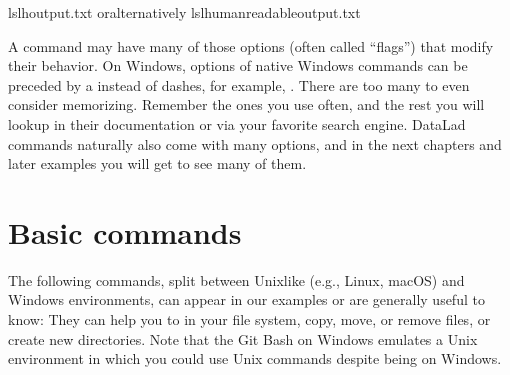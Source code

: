 \begin{sphinxVerbatim}[commandchars=\\\{\}]
ls\PYGZhy{}lhoutput.txt
oralternatively
ls\PYGZhy{}l\PYGZhy{}\PYGZhy{}human\PYGZhy{}readableoutput.txt
\end{sphinxVerbatim}

\sphinxAtStartPar
A command may have many of those options (often called “flags”) that modify their behavior.
On Windows, options of native Windows commands can be preceded by a \sphinxcode{\sphinxupquote{/}} instead of dashes, for example, .
There are too many to even consider memorizing. Remember the ones you use often,
and the rest you will lookup in their documentation or via your favorite search engine.
DataLad commands naturally also come with many options, and in the next chapters
and later examples you will get to see many of them.


\section{Basic commands}
\label{\detokenize{intro/howto:basic-commands}}
\sphinxAtStartPar
The following commands, split between Unix\sphinxhyphen{}like (e.g., Linux, macOS) and Windows environments, can appear in our examples or are generally useful to know:
They can help you to  in your file system, copy, move, or remove files, or create new directories.
Note that the Git Bash on Windows emulates a Unix environment in which you could use Unix commands despite being on Windows.

\ignorespaces 

